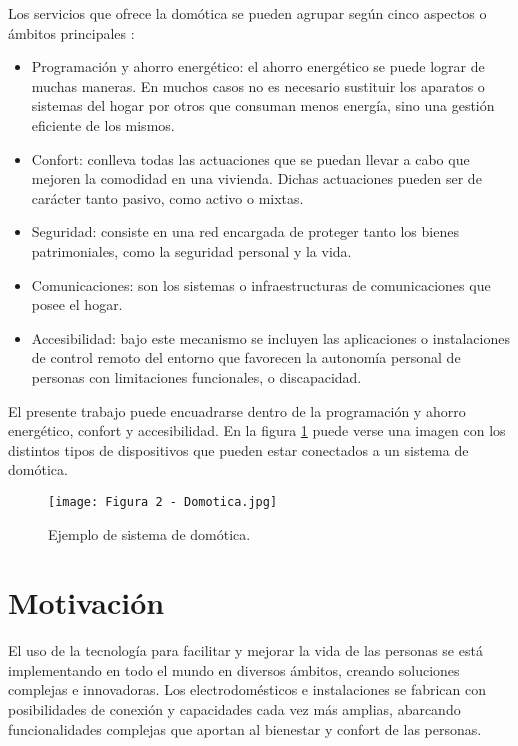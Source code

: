 Los servicios que ofrece la domótica se pueden agrupar según cinco aspectos o ámbitos principales \citep{2}:

\begin{itemize}
	\item Programación y ahorro energético: el ahorro energético se puede lograr de muchas maneras. En muchos casos no es necesario sustituir los aparatos o sistemas del hogar por otros que consuman menos energía, sino una gestión eficiente de los mismos.
	\item Confort: conlleva todas las actuaciones que se puedan llevar a cabo que mejoren la comodidad en una vivienda. Dichas actuaciones pueden ser de carácter tanto pasivo, como activo o mixtas.
	\item Seguridad: consiste en una red encargada de proteger tanto los bienes patrimoniales, como la seguridad personal y la vida.
	\item Comunicaciones: son los sistemas o infraestructuras de comunicaciones que posee el hogar.
	\item Accesibilidad: bajo este mecanismo se incluyen las aplicaciones o instalaciones de control remoto del entorno que favorecen la autonomía personal de personas con limitaciones funcionales, o discapacidad.
\end{itemize}

El presente trabajo puede encuadrarse dentro de la programación y ahorro energético, confort y accesibilidad. En la figura \ref{fig:2} puede verse una imagen con los distintos tipos de dispositivos que pueden estar conectados a un sistema de domótica.

\begin{figure}[h]
\centering
\texttt{[image: Figura 2 - Domotica.jpg]}
\caption[Ejemplo de sistema de domótica]{Ejemplo de sistema de domótica. \protect\footnotemark}
\label{fig:2}
\end{figure}

\section{Motivación}

El uso de la tecnología para facilitar y mejorar la vida de las personas se está implementando en todo el mundo en diversos ámbitos, creando soluciones complejas e innovadoras. Los electrodomésticos e instalaciones se fabrican con posibilidades de conexión y capacidades cada vez más amplias, abarcando funcionalidades complejas que aportan al bienestar y confort de las personas.

